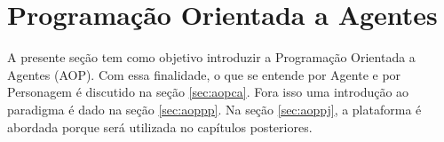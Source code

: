 \section{Programação Orientada a Agentes}

A presente seção tem como objetivo introduzir a Programação Orientada a
Agentes (AOP). Com essa finalidade,
o que se entende por Agente e por Personagem é discutido na seção
\ref{sec:aopca}. Fora isso uma introdução ao paradigma é dado na seção
\ref{sec:aoppp}. Na seção \ref{sec:aoppj}, a plataforma \jason é abordada
porque será utilizada no capítulos posteriores.





